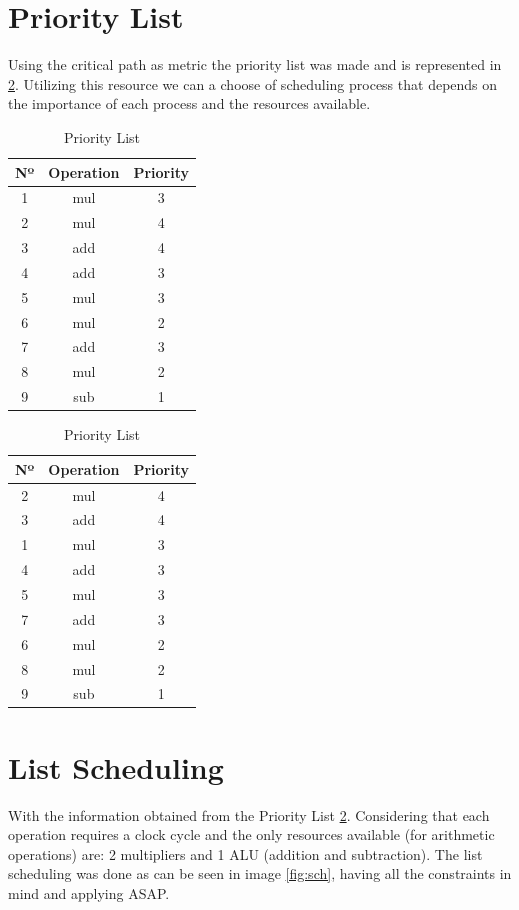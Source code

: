 \documentclass[12pt]{article}
\begin{document}
\section{Priority List}
Using the critical path as metric the priority list was made and is represented in \ref{tab:list}. Utilizing this resource we can a choose of scheduling process that depends on the importance of each process and the resources available.

\begin{table}[H]
	\center
	\begin{tabular}{|c|c|c|}
		\hline
		  Nº & Operation & Priority \\
		\hline
		1 & mul & 3 \\
		\hline
        2 & mul & 4 \\
		\hline
        3 & add & 4 \\
		\hline
        4 & add & 3 \\
		\hline
        5 & mul & 3 \\
		\hline
        6 & mul & 2 \\
		\hline
        7 & add & 3 \\
		\hline
        8 & mul & 2 \\
		\hline
        9 & sub & 1 \\
		\hline
	\end{tabular}
    \begin{tabular}{|c|c|c|}
		\hline
		  Nº & Operation & Priority \\
		\hline
        2 & mul & 4 \\
        \hline
        3 & add & 4 \\
		\hline
        1 & mul & 3 \\
		\hline
        4 & add & 3 \\
		\hline
        5 & mul & 3 \\
		\hline
        7 & add & 3 \\
        \hline
        6 & mul & 2 \\
		\hline
        8 & mul & 2 \\
		\hline
        9 & sub & 1 \\
		\hline
	\end{tabular}
	\caption{Priority List}
	\label{tab:list}
\end{table}
\section{List Scheduling}
With the information obtained from the Priority List \ref{tab:list}. Considering that each operation requires a clock cycle and the only resources available (for arithmetic operations) are: 2 multipliers and 1 ALU (addition and subtraction). The list scheduling was done as can be seen in image \ref{fig:sch}, having all the constraints in mind and applying ASAP.
\end{document}
